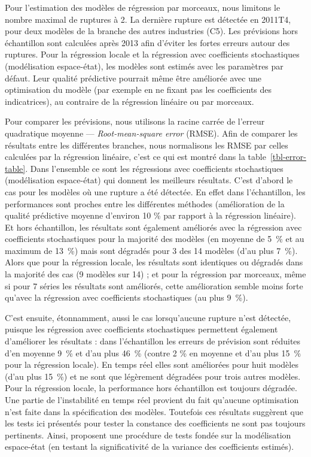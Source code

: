 \documentclass[
  a4paper,
  DIV=11,
  numbers=noendperiod,
  french]{scrartcl}
\newcommand\1{{\mathds 1}}
\theoremstyle{remark}
\begin{document}
Pour l'estimation des modèles de régression par morceaux, nous limitons
le nombre maximal de ruptures à 2. La dernière rupture est détectée en
2011T4, pour deux modèles de la branche des autres industries (C5). Les
prévisions hors échantillon sont calculées après 2013 afin d'éviter les
fortes erreurs autour des ruptures. Pour la régression locale et la
régression avec coefficients stochastiques (modélisation espace-état),
les modèles sont estimés avec les paramètres par défaut. Leur qualité
prédictive pourrait même être améliorée avec une optimisation du modèle
(par exemple en ne fixant pas les coefficients des indicatrices), au
contraire de la régression linéaire ou par morceaux.

Pour comparer les prévisions, nous utilisons la racine carrée de
l'erreur quadratique moyenne --- \emph{Root-mean-square error} (RMSE).
Afin de comparer les résultats entre les différentes branches, nous
normalisons les RMSE par celles calculées par la régression linéaire,
c'est ce qui est montré dans la table~\ref{tbl-error-table}. Dans
l'ensemble ce sont les régressions avec coefficients stochastiques
(modélisation espace-état) qui donnent les meilleurs résultats. C'est
d'abord le cas pour les modèles où une rupture a été détectée. En effet
dans l'échantillon, les performances sont proches entre les différentes
méthodes (amélioration de la qualité prédictive moyenne d'environ 10 \%
par rapport à la régression linéaire). Et hors échantillon, les
résultats sont également améliorés avec la régression avec coefficients
stochastiques pour la majorité des modèles (en moyenne de 5~\% et au
maximum de 13~\%) mais sont dégradés pour 3 des 14 modèles (d'au plus
7~\%). Alors que pour la régression locale, les résultats sont
identiques ou dégradés dans la majorité des cas (9 modèles sur 14) ; et
pour la régression par morceaux, même si pour 7 séries les résultats
sont améliorés, cette amélioration semble moins forte qu'avec la
régression avec coefficients stochastiques (au plus 9~\%).

C'est ensuite, étonnamment, aussi le cas lorsqu'aucune rupture n'est
détectée, puisque les régression avec coefficients stochastiques
permettent également d'améliorer les résultats : dans l'échantillon les
erreurs de prévision sont réduites d'en moyenne 9~\% et d'au plus 46~\%
(contre 2 \% en moyenne et d'au plus 15~\% pour la régression locale).
En temps réel elles sont améliorées pour huit modèles (d'au plus 15~\%)
et ne sont que légèrement dégradées pour trois autres modèles. Pour la
régression locale, la performance hors échantillon est toujours
dégradée. Une partie de l'instabilité en temps réel provient du fait
qu'aucune optimisation n'est faite dans la spécification des modèles.
Toutefois ces résultats suggèrent que les tests ici présentés pour
tester la constance des coefficients ne sont pas toujours pertinents.
Ainsi, \textcite{abs2006} proposent une procédure de tests fondée sur la
modélisation espace-état (en testant la significativité de la variance
des coefficients estimés).
\end{document}
